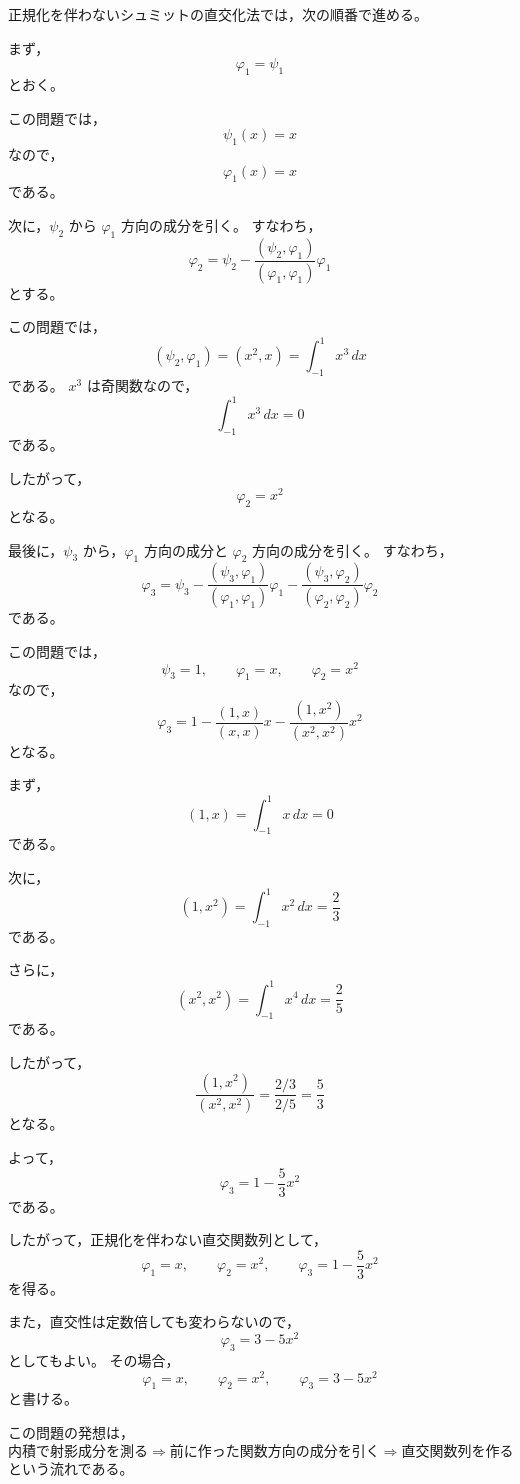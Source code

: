 \begin{strategy}
	正規化を伴わないシュミットの直交化法では，次の順番で進める。
	
	まず，
	\[
	\varphi_1=\psi_1
	\]
	とおく。
	
	この問題では，
	\[
	\psi_1(x)=x
	\]
	なので，
	\[
	\varphi_1(x)=x
	\]
	である。
	
	次に，\(\psi_2\) から \(\varphi_1\) 方向の成分を引く。
	すなわち，
	\[
	\varphi_2
	=
	\psi_2
	-
	\frac{(\psi_2,\varphi_1)}{(\varphi_1,\varphi_1)}
	\varphi_1
	\]
	とする。
	
	この問題では，
	\[
	(\psi_2,\varphi_1)
	=
	(x^2,x)
	=
	\int_{-1}^{1}x^3\,dx
	\]
	である。
	\(x^3\) は奇関数なので，
	\[
	\int_{-1}^{1}x^3\,dx=0
	\]
	である。
	
	したがって，
	\[
	\varphi_2=x^2
	\]
	となる。
	
	最後に，\(\psi_3\) から，\(\varphi_1\) 方向の成分と
	\(\varphi_2\) 方向の成分を引く。
	すなわち，
	\[
	\varphi_3
	=
	\psi_3
	-
	\frac{(\psi_3,\varphi_1)}{(\varphi_1,\varphi_1)}
	\varphi_1
	-
	\frac{(\psi_3,\varphi_2)}{(\varphi_2,\varphi_2)}
	\varphi_2
	\]
	である。
	
	この問題では，
	\[
	\psi_3=1,\qquad
	\varphi_1=x,\qquad
	\varphi_2=x^2
	\]
	なので，
	\[
	\varphi_3
	=
	1
	-
	\frac{(1,x)}{(x,x)}x
	-
	\frac{(1,x^2)}{(x^2,x^2)}x^2
	\]
	となる。
	
	まず，
	\[
	(1,x)=\int_{-1}^{1}x\,dx=0
	\]
	である。
	
	次に，
	\[
	(1,x^2)=\int_{-1}^{1}x^2\,dx=\frac{2}{3}
	\]
	である。
	
	さらに，
	\[
	(x^2,x^2)=\int_{-1}^{1}x^4\,dx=\frac{2}{5}
	\]
	である。
	
	したがって，
	\[
	\frac{(1,x^2)}{(x^2,x^2)}
	=
	\frac{2/3}{2/5}
	=
	\frac{5}{3}
	\]
	となる。
	
	よって，
	\[
	\varphi_3
	=
	1-\frac{5}{3}x^2
	\]
	である。
	
	したがって，正規化を伴わない直交関数列として，
	\[
	\varphi_1=x,\qquad
	\varphi_2=x^2,\qquad
	\varphi_3=1-\frac{5}{3}x^2
	\]
	を得る。
	
	また，直交性は定数倍しても変わらないので，
	\[
	\varphi_3=3-5x^2
	\]
	としてもよい。
	その場合，
	\[
	\varphi_1=x,\qquad
	\varphi_2=x^2,\qquad
	\varphi_3=3-5x^2
	\]
	と書ける。
	
	この問題の発想は，
	\[
	\text{内積で射影成分を測る}
	\Rightarrow
	\text{前に作った関数方向の成分を引く}
	\Rightarrow
	\text{直交関数列を作る}
	\]
	という流れである。
\end{strategy}